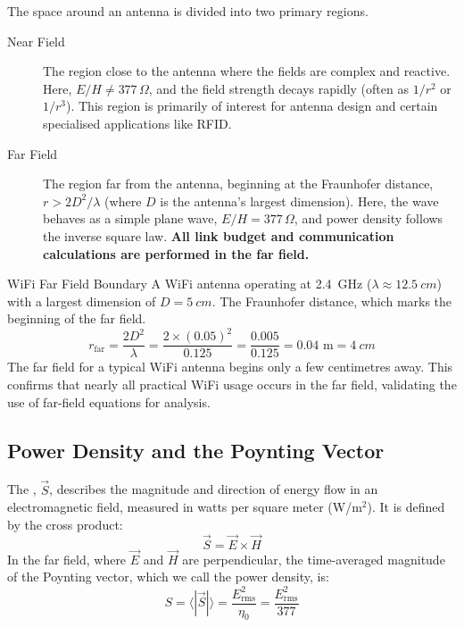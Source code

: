 The space around an antenna is divided into two primary regions.
\begin{description}
    \item[Near Field] The region close to the antenna where the fields are complex and reactive. Here, $E/H \neq 377\,\Omega$, and the field strength decays rapidly (often as $1/r^2$ or $1/r^3$). This region is primarily of interest for antenna design and certain specialised applications like RFID.
    \item[Far Field] The region far from the antenna, beginning at the Fraunhofer distance, $r > 2D^2/\lambda$ (where $D$ is the antenna's largest dimension). Here, the wave behaves as a simple plane wave, $E/H = 377\,\Omega$, and power density follows the inverse square law. \textbf{All link budget and communication calculations are performed in the far field.}
\end{description}

\begin{workedexample}{WiFi Far Field Boundary}
     A WiFi antenna operating at \qty{2.4}{GHz} ($\lambda \approx \qty{12.5}{cm}$) with a largest dimension of $D = \qty{5}{cm}$.
     The Fraunhofer distance, which marks the beginning of the far field.
    \[
        r_{\text{far}} = \frac{2D^2}{\lambda} = \frac{2 \times (0.05)^2}{0.125} = \frac{0.005}{0.125} = 0.04 \text{ m} = \qty{4}{cm}
    \]
     The far field for a typical WiFi antenna begins only a few centimetres away. This confirms that nearly all practical WiFi usage occurs in the far field, validating the use of far-field equations for analysis.
\end{workedexample}

\subsection{Power Density and the Poynting Vector}

The , $\vec{S}$, describes the magnitude and direction of energy flow in an electromagnetic field, measured in watts per square meter (W/m$^2$). It is defined by the cross product:
\begin{equation}
    \vec{S} = \vec{E} \times \vec{H}
\end{equation}
In the far field, where $\vec{E}$ and $\vec{H}$ are perpendicular, the time-averaged magnitude of the Poynting vector, which we call the power density, is:
\begin{equation}
    S = \langle |\vec{S}| \rangle = \frac{E_{\text{rms}}^2}{\eta_0} = \frac{E_{\text{rms}}^2}{377}
\end{equation}

